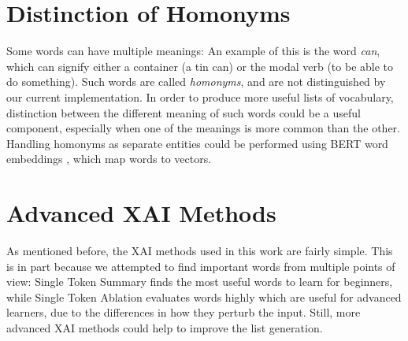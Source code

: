 \section{Distinction of Homonyms}
Some words can have multiple meanings:
An example of this is the word \textit{can}, which can signify either a container (a tin can) or the modal verb (to be able to do something).
Such words are called \textit{homonyms}, and are not distinguished by our current implementation.
In order to produce more useful lists of vocabulary, distinction between the different meaning of such words could be a useful component, especially when one of the meanings is more common than the other.
Handling homonyms as separate entities could be performed using BERT word embeddings \cite{kentonBertPretrainingDeep2019}, which map words to vectors.


\section{Advanced XAI Methods}
As mentioned before, the XAI methods used in this work are fairly simple.
This is in part because we attempted to find important words from multiple points of view:
Single Token Summary finds the most useful words to learn for beginners, while Single Token Ablation evaluates words highly which are useful for advanced learners, due to the differences in how they perturb the input.
Still, more advanced XAI methods could help to improve the list generation. 



